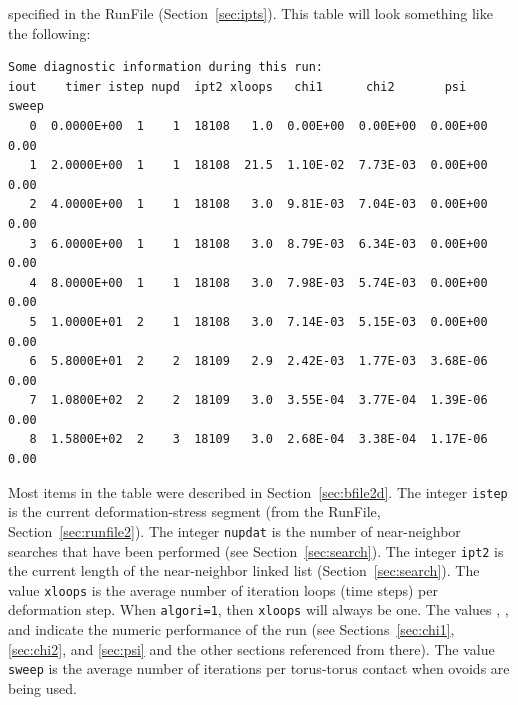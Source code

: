 \documentclass[letterpaper,11pt]{article}
\begin{document}
specified in the \textsf{RunFile} (Section~\ref{sec:ipts}).
This table will look something like the following:
\par
\footnotesize
\label{verb:screen2}
\begin{verbatim}
Some diagnostic information during this run:
iout    timer istep nupd  ipt2 xloops   chi1      chi2       psi    sweep
   0  0.0000E+00  1    1  18108   1.0  0.00E+00  0.00E+00  0.00E+00  0.00
   1  2.0000E+00  1    1  18108  21.5  1.10E-02  7.73E-03  0.00E+00  0.00
   2  4.0000E+00  1    1  18108   3.0  9.81E-03  7.04E-03  0.00E+00  0.00
   3  6.0000E+00  1    1  18108   3.0  8.79E-03  6.34E-03  0.00E+00  0.00
   4  8.0000E+00  1    1  18108   3.0  7.98E-03  5.74E-03  0.00E+00  0.00
   5  1.0000E+01  2    1  18108   3.0  7.14E-03  5.15E-03  0.00E+00  0.00
   6  5.8000E+01  2    2  18109   2.9  2.42E-03  1.77E-03  3.68E-06  0.00
   7  1.0800E+02  2    2  18109   3.0  3.55E-04  3.77E-04  1.39E-06  0.00
   8  1.5800E+02  2    3  18109   3.0  2.68E-04  3.38E-04  1.17E-06  0.00
\end{verbatim}
\normalsize
Most items in the table were described in
Section~\ref{sec:bfile2d}.
The integer \texttt{istep} is the current
deformation-stress segment
(from the \textsf{RunFile}, Section~\ref{sec:runfile2}).
The integer \texttt{nupdat} is the number of near-neighbor searches that
have been performed (see Section~\ref{sec:search}).
The integer \texttt{ipt2} is the current length of the near-neighbor
linked list (Section~\ref{sec:search}).
The value \texttt{xloops} is the average number of iteration loops
(time steps) per deformation step.  When \texttt{algori=1}, then
\texttt{xloops} will always be one.
The values \texttt{}, \texttt{}, and \texttt{} indicate the 
numeric performance of the run (see Sections~\ref{sec:chi1}, \ref{sec:chi2}, 
and \ref{sec:psi} and the other sections referenced from there).
The value \texttt{sweep} is the average number of iterations per
torus-torus contact when ovoids are being used.
%
%
\end{document}
